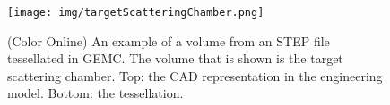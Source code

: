 \begin{figure}
	\centering
	\texttt{[image: img/targetScatteringChamber.png]}
	\caption{(Color Online) An example of a volume from an STEP file tessellated in GEMC. The volume that is shown is the target scattering chamber.
            Top: the CAD representation in the engineering model. Bottom: the tessellation. }
	\label{fig:targetScatteringChamber}
\end{figure}




